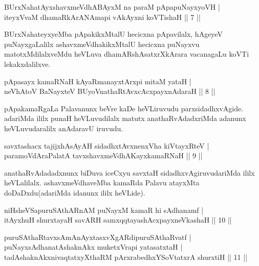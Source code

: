 
\begin{shl}
BUrxNahatAyxshavxmeVdhABAyxM na paraM pApapuNayxyoVH |\\
iteyxVvaM dhamaRkArANAmapi vAkAyxni koVTishaH \hfill || 7 ||
\end{shl}

\begin{artha}
BUrxNahateyxyeMba pApakikxMtalU hecicxna pApavilalx, hAgeyeV puNayxgaLalilx ashavxmeVdhakikxMtalU hecicxna puNayxvu matotxMdilalxveMdu heVLuva dhamARshAsatxrXkArara vacanagaLu koVTi lekakxdalilxve.
\end{artha}


\begin{shl}
pApasayx kamaRNaH kAyaRmanayxtArxpi mitaM yataH |\\
neVhAtoV BaNayxteV  BUyoV\s nathaRtAvxcAcxpayxnAdaraH \hfill || 8 ||
\end{shl}

\begin{artha}
pApakamaRgaLa Palavanunx beVre kaDe heVLiruvudu parxsidadhxvAgide. adariMda ililx punaH heVLuvudilalx matutx anathaRvAdadxriMda adanunx heVLuvudaralilx anAdaravU iruvudu.
\end{artha}

\begin{shl}
savxtashacx tajijxhAsAyAH sidadhxtAvxnenxVha kiVtayxRteV |\\
paramoVdAraPalatA tavxshavxmeVdhAKayxkamaRNaH \hfill || 9 ||
\end{shl}

\begin{artha}
anathaRvAdadadxnunx biDuva iceCxyu savxtaH sidadhxvAgiruvudariMda ililx heVLalilalx. ashavxmeVdhaveMba kamaRda Palavu atayxMta doDaDxdu\break (adariMda idanunx ililx heVLide).
\end{artha}


\begin{shl}
niHsheVSapuruSAthARnAM puNayxM kamaR hi sAdhanamf |\\
itAyxhuH shurxtayaH savARH samxqqtayashAcxpayxneVkashaH \hfill || 10 ||
\end{shl}

\begin{shl}
puruSAthaRtavxsAmAnAyxtasxvXgARdipuruSAthaRvatf |\\
puNayxsAdhanatAshaknAkx muketxVrapi yatasatxtaH |\\
tadAshaknAkxnivaqtatxyXthaRM pArxrabedhxYSoVtatxrA shurxtiH \hfill || 11 ||
\end{shl}

